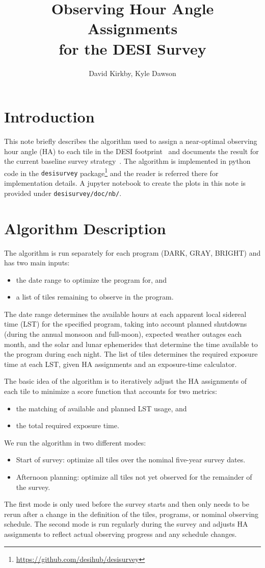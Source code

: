 \documentclass[12pt]{article}
\title{Observing Hour Angle Assignments\\
for the DESI Survey\\
\vspace{5mm}{\large\bf DESI-doc-3060-v1}}
\author{David Kirkby, Kyle Dawson}
\begin{document}
\maketitle

\section{Introduction}

This note briefly describes the algorithm used to assign a near-optimal observing hour angle (HA) to each tile in the DESI footprint~\cite{desi-717} and documents the result for the current baseline survey strategy~\cite{desi-1767, desi-1770}. The algorithm is implemented in python code in the {\tt desisurvey} package\footnote{\url{https://github.com/desihub/desisurvey}} and the reader is referred there for implementation details. A jupyter notebook to create the plots in this note is provided under {\tt desisurvey/doc/nb/}.

\section{Algorithm Description}

The algorithm is run separately for each program (DARK, GRAY, BRIGHT) and has two main inputs:
\begin{itemize}
    \item the date range to optimize the program for, and
    \item a list of tiles remaining to observe in the program.
\end{itemize}
The date range determines the available hours at each apparent local sidereal time (LST) for the specified program, taking into account planned shutdowns (during the annual monsoon and full-moon), expected weather outages each month, and the solar and lunar ephemerides that determine the time available to the program during each night. The list of tiles determines the required exposure time at each LST, given HA assignments and an exposure-time calculator.

The basic idea of the algorithm is to iteratively adjust the HA assignments of each tile to minimize a score function that accounts for two metrics:
\begin{itemize}
    \item the matching of available and planned LST usage, and
    \item the total required exposure time.
\end{itemize}
We run the algorithm in two different modes:
\begin{itemize}
    \item Start of survey: optimize all tiles over the nominal five-year survey dates.
    \item Afternoon planning: optimize all tiles not yet observed for the remainder of the survey.
\end{itemize}
The first mode is only used before the survey starts and then only needs to be rerun after a change in the definition of the tiles, programs, or nominal observing schedule. The second mode is run regularly during the survey and adjusts HA assignments to reflect actual observing progress and any schedule changes.
\end{document}
